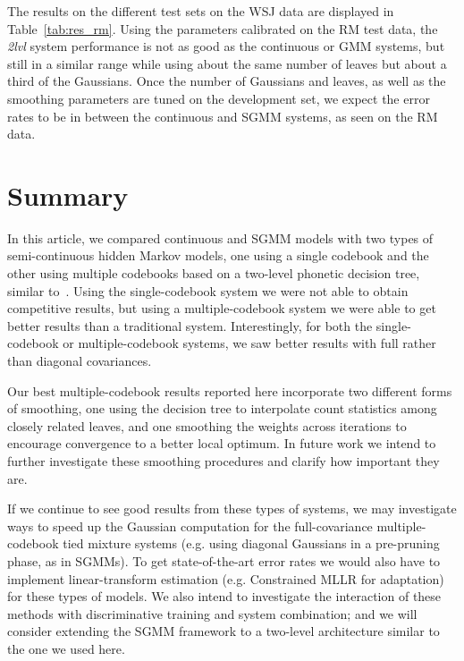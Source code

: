 \documentclass{article}
\begin{document}
The results on the different test sets on the WSJ data are displayed in
Table~\ref{tab:res_rm}.
Using the parameters calibrated on the RM test data, the {\em 2lvl} system
performance is not as good as the continuous or GMM systems, but still
in a similar range while using about the same number of leaves but about a
third of the Gaussians.
Once the number of Gaussians and leaves, as well as the smoothing parameters 
are tuned on the development set, we expect the error rates to be in between 
the continuous and SGMM systems, as seen on the RM data.

\section{Summary}
\label{sec:summary}

In this article, we compared continuous and SGMM models with
two types of semi-continuous hidden Markov models, one using a single codebook 
and the other using multiple codebooks based on a two-level phonetic decision tree,
similar to~\cite{prasad2004t2b}.
Using the single-codebook system we were not able to obtain competitive
results, but using a multiple-codebook system 
we were able to get better results than a traditional system.  Interestingly,
for both the single-codebook or multiple-codebook systems, we saw better
results with full rather than diagonal covariances.  

Our best multiple-codebook results reported here incorporate two different forms of 
smoothing, one using the decision tree to interpolate count statistics among closely
related leaves, and one smoothing the weights across iterations to encourage 
convergence to a better local optimum.  In future work we intend to further investigate
these smoothing procedures and clarify how important they are.

If we continue to see good results from these types of systems, 
we may investigate ways to speed up the Gaussian computation for the 
full-covariance multiple-codebook tied mixture systems (e.g. using
diagonal Gaussians in a pre-pruning phase, as in SGMMs).  To get state-of-the-art
error rates we would also have to 
implement linear-transform estimation (e.g. Constrained MLLR for adaptation)
for these types of models.  We also intend to investigate the interaction of these
methods with discriminative training and system combination; and we will
consider extending the SGMM framework to a two-level architecture similar to
the one we used here.


\footnotesize


\end{document}
